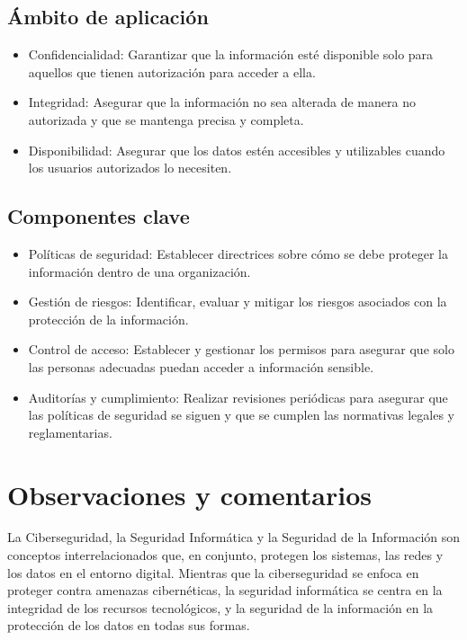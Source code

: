 \documentclass{article}
\begin{document}
\subsection{Ámbito de aplicación}
\begin{itemize}
    \item Confidencialidad: Garantizar que la información esté disponible solo para aquellos que tienen autorización para acceder a ella.
    \item Integridad: Asegurar que la información no sea alterada de manera no autorizada y que se mantenga precisa y completa.
    \item Disponibilidad: Asegurar que los datos estén accesibles y utilizables cuando los usuarios autorizados lo necesiten.
\end{itemize}

\subsection{Componentes clave}
\begin{itemize}
    \item Políticas de seguridad: Establecer directrices sobre cómo se debe proteger la información dentro de una organización.
    \item Gestión de riesgos: Identificar, evaluar y mitigar los riesgos asociados con la protección de la información.
    \item Control de acceso: Establecer y gestionar los permisos para asegurar que solo las personas adecuadas puedan acceder a información sensible.
    \item Auditorías y cumplimiento: Realizar revisiones periódicas para asegurar que las políticas de seguridad se siguen y que se cumplen las normativas legales y reglamentarias.
\end{itemize}

\section{Observaciones y comentarios}
La Ciberseguridad, la Seguridad Informática y la Seguridad de la Información son conceptos interrelacionados que, en conjunto, protegen los sistemas, las redes y los datos en el entorno digital. Mientras que la ciberseguridad se enfoca en proteger contra amenazas cibernéticas, la seguridad informática se centra en la integridad de los recursos tecnológicos, y la seguridad de la información en la protección de los datos en todas sus formas.
\end{document}
